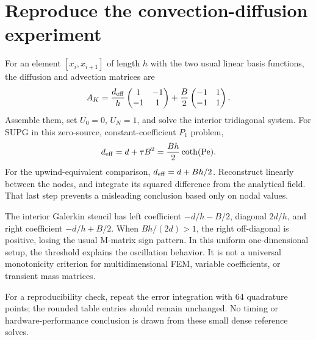 \documentclass[11pt,a4paper]{article}
\begin{document}
\section{Reproduce the convection-diffusion experiment}\label{app:stencil}
For an element $[x_i,x_{i+1}]$ of length $h$ with the two usual linear basis functions, the diffusion and advection matrices are
\begin{equation}
A_K=\frac{d_{\rm eff}}h
\begin{pmatrix}1&-1\\-1&1\end{pmatrix}
+\frac B2\begin{pmatrix}-1&1\\-1&1\end{pmatrix}.
\end{equation}
Assemble them, set $U_0=0$, $U_N=1$, and solve the interior tridiagonal system. For SUPG in this zero-source, constant-coefficient $P_1$ problem,
\begin{equation}
d_{\rm eff}=d+\tau B^2=\frac{Bh}{2}\coth(\mathrm{Pe}).
\end{equation}
For the upwind-equivalent comparison, $d_{\rm eff}=d+Bh/2$. Reconstruct linearly between the nodes, and integrate its squared difference from the analytical field. That last step prevents a misleading conclusion based only on nodal values.

The interior Galerkin stencil has left coefficient $-d/h-B/2$, diagonal $2d/h$, and right coefficient $-d/h+B/2$. When $Bh/(2d)>1$, the right off-diagonal is positive, losing the usual M-matrix sign pattern. In this uniform one-dimensional setup, the threshold explains the oscillation behavior. It is not a universal monotonicity criterion for multidimensional FEM, variable coefficients, or transient mass matrices.

For a reproducibility check, repeat the error integration with 64 quadrature points; the rounded table entries should remain unchanged. No timing or hardware-performance conclusion is drawn from these small dense reference solves.
\end{document}
